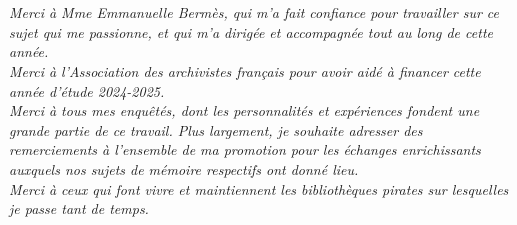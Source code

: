 \chapter*{}

\textit{Merci à Mme Emmanuelle Bermès, qui m'a fait confiance pour travailler sur ce sujet qui me passionne, et qui m'a dirigée et accompagnée tout au long de cette année.
}\\

\textit{Merci à l'Association des archivistes français pour avoir aidé à financer cette année d'étude 2024-2025.}\\

\textit{Merci à tous mes enquêtés, dont les personnalités et expériences fondent une grande partie de ce travail. Plus largement, je souhaite adresser des remerciements à l’ensemble de ma promotion pour les échanges enrichissants auxquels nos sujets de mémoire respectifs ont donné lieu.}\\

\textit{Merci à ceux qui font vivre et maintiennent les bibliothèques pirates sur lesquelles je passe tant de temps.}